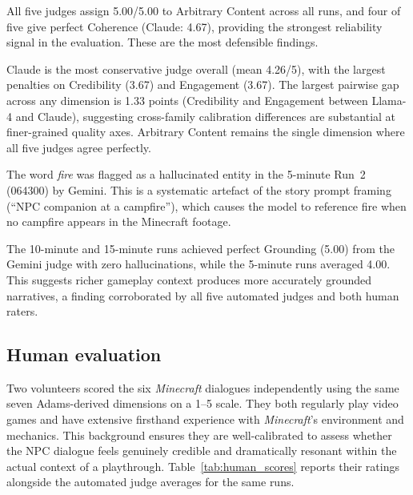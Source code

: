 \documentclass{article}
\begin{document}
All five judges assign 5.00/5.00 to Arbitrary Content across all runs, and four of five give perfect Coherence (Claude: 4.67), providing the strongest reliability signal in the evaluation. These are the most defensible findings.

Claude is the most conservative judge overall (mean 4.26/5), with the largest penalties on Credibility (3.67) and Engagement (3.67). The largest pairwise gap across any dimension is 1.33 points (Credibility and Engagement between Llama-4 and Claude), suggesting cross-family calibration differences are substantial at finer-grained quality axes. Arbitrary Content remains the single dimension where all five judges agree perfectly.

The word \emph{fire} was flagged as a hallucinated entity in the 5-minute Run~2 (064300) by Gemini. This is a systematic artefact of the story prompt framing (``NPC companion at a campfire''), which causes the model to reference fire when no campfire appears in the Minecraft footage.

The 10-minute and 15-minute runs achieved perfect Grounding (5.00) from the Gemini judge with zero hallucinations, while the 5-minute runs averaged 4.00. This suggests richer gameplay context produces more accurately grounded narratives, a finding corroborated by all five automated judges and both human raters.

\subsection{Human evaluation}

Two volunteers %
scored the six \emph{Minecraft} dialogues independently using the same seven Adams-derived dimensions on a 1--5 scale.
They %
both regularly play video games and have extensive firsthand experience with \emph{Minecraft}'s environment and mechanics. This background ensures they are well-calibrated to assess whether the NPC dialogue feels genuinely credible and dramatically resonant within the actual context of a playthrough. Table~\ref{tab:human_scores} reports their ratings alongside the automated judge averages for the same runs.
\end{document}
